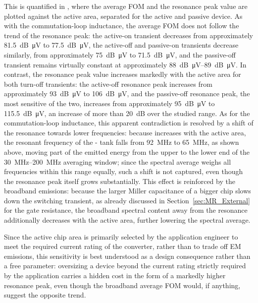 This is quantified in , where the average FOM and the resonance peak value are plotted against the active area, separated for the active and passive device.
As with the commutation-loop inductance, the average FOM does not follow the trend of the resonance peak: the active-on transient decreases from approximately \SI{81.5}{dB\micro V} to \SI{77.5}{dB\micro V}, the active-off and passive-on transients decrease similarly, from approximately \SI{75}{dB\micro V} to \SI{71.5}{dB\micro V}, and the passive-off transient remains virtually constant at approximately \SIrange{88}{89}{dB\micro V}.
In contrast, the resonance peak value increases markedly with the active area for both turn-off transients: the active-off resonance peak increases from approximately \SI{93}{dB\micro V} to \SI{106}{dB\micro V}, and the passive-off resonance peak, the most sensitive of the two, increases from approximately \SI{95}{dB\micro V} to \SI{115.5}{dB\micro V}, an increase of more than \SI{20}{dB} over the studied range.
As for the commutation-loop inductance, this apparent contradiction is resolved by a shift of the resonance towards lower frequencies: because  increases with the active area, the resonant frequency of the - tank falls from \SI{92}{MHz} to \SI{65}{MHz}, as shown above, moving part of the emitted energy from the upper to the lower end of the \SIrange{30}{200}{MHz} averaging window; since the spectral average weighs all frequencies within this range equally, such a shift is not captured, even though the resonance peak itself grows substantially.
This effect is reinforced by the broadband emissions: because the larger Miller capacitance of a bigger chip slows down the switching transient, as already discussed in Section~\ref{sec:MR_External} for the gate resistance, the broadband spectral content away from the resonance additionally decreases with the active area, further lowering the spectral average.

Since the active chip area is primarily selected by the application engineer to meet the required current rating of the converter, rather than to trade off EM emissions, this sensitivity is best understood as a design consequence rather than a free parameter: oversizing a device beyond the current rating strictly required by the application carries a hidden cost in the form of a markedly higher resonance peak, even though the broadband average FOM would, if anything, suggest the opposite trend.

\FloatBarrier

